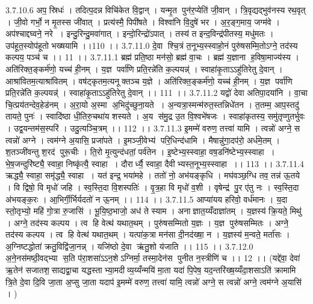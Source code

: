 3.7.10.6
अप॒ स्रिधः॑ । तदित्प॒दन्न विचि॑केत वि॒द्वान् । यन्मृ॒त पुन॑र॒प्येति॑ जी॒वान् । त्रि॒वृद्यद्भुव॑नस्य रथ॒वृत् । जी॒वो गर्भो॒ न मृ॒तस्स जी॑वात् । प्रत्य॑स्मै॒ पिपी॑षते । विश्वा॑नि वि॒दुषे॑ भर । अ॒र॒ङ्ग॒माय॒ जग्म॑वे । अप॑श्चाद्दघ्वने॒ नरे । इन्दु॒रिन्दु॒मवा॑गात् । इन्दो॒रिन्द्रो॑ऽपात् । तस्य॑ त इन्द॒विन्द्र॑पीतस्य॒ मधु॑मतः । उप॑हूत॒स्योप॑हूतो भख्षयामि ।।110 ।।
3.7.11.0
दे॒वा श्चि॒त्रं त॒नूभ्य॒स्स्वाहो॒नं पुरु॑षसम्मि॒तोऽग्ने॒ तद॑स्य कल्पय॒ पञ्च॑ च ।। 11 ।।
3.7.11.1
ब्रह्म॑ प्रति॒ष्ठा मन॑सो॒ ब्रह्म॑ वा॒चः । ब्रह्म॑ य॒ज्ञाना॑ ह॒विषा॒माज्य॑स्य । अति॑रिक्त॒ङ्कर्म॑णो॒ यच्च॑ ही॒नम् । य॒ज्ञ पर्वा॑णि प्रति॒रन्ने॑ति क॒ल्पयन्न्॑ । स्वाहा॑कृ॒ताऽऽहु॑तिरेतु दे॒वान् । आश्रा॑वितम॒त्याश्रा॑वितम् । वष॑ट्कृतम॒त्यनूक्तञ्च य॒ज्ञे । अति॑रिक्त॒ङ्कर्म॑णो॒ यच्च॑ ही॒नम् । य॒ज्ञ पर्वा॑णि प्रति॒रन्ने॑ति क॒ल्पयन्न्॑ । स्वाहा॑कृ॒ताऽऽहु॑तिरेतु दे॒वान् ।। 111 ।।
3.7.11.2
यद्वो॑ देवा अतिपा॒दया॑नि । वा॒चा चि॒त्प्रय॑तन्देव॒हेड॑नम् । अ॒रा॒यो अ॒स्मा अ॒भिदु॑च्छुना॒यते । अ॒न्यत्रा॒स्मन्म॑रुत॒स्तन्निधे॑तन । त॒तम्म॒ आप॒स्तदु॑ तायते॒ पुनः॑ । स्वादि॑ष्ठा धी॒तिरु॒चथा॑य शस्यते । अ॒य स॑मु॒द्र उ॒त वि॒श्वभे॑षजः । स्वाहा॑कृतस्य॒ समु॑तृप्णुतर्भुवः । उद्व॒यन्तम॑स॒स्परि॑ । उदु॒त्यञ्चि॒त्रम् ।। 112 ।।
3.7.11.3
इ॒मम्मे॑ वरुण॒ तत्त्वा॑ यामि । त्वन्नो॑ अग्ने॒ स त्वन्नो॑ अग्ने । त्वम॑ग्ने अ॒यासि॒ प्रजा॑पते । इ॒मञ्जी॒वेभ्य॑ परि॒धिन्द॑धामि । मैषान्नु॑गा॒दप॑रो॒ अर्ध॑मे॒तम् । श॒तञ्जी॑वन्तु श॒रद॑ पुरू॒चीः । ति॒रो मृ॒त्युन्द॑धतां॒ पर्व॑तेन । इ॒ष्टेभ्य॒स्स्वाहा॒ वष॒डनि॑ष्टेभ्य॒स्स्वाहा । भे॒ष॒जन्दुरि॑ष्ट्यै॒ स्वाहा॒ निष्कृ॑त्यै॒ स्वाहा । दौरार्ध्यै॒ स्वाहा॒ दैवीभ्यस्त॒नूभ्य॒स्स्वाहा ।। 113 ।।
3.7.11.4
ऋद्ध्यै॒ स्वाहा॒ समृ॑द्ध्यै॒ स्वाहा । यत॑ इन्द्र॒ भया॑महे । ततो॑ नो॒ अभ॑यङ्कृधि । मघ॑वञ्छ॒ग्धि तव॒ तन्न॑ ऊ॒तये । वि द्विषो॒ वि मृधो॑ जहि । स्व॒स्ति॒दा वि॒शस्पतिः॑ । वृ॒त्र॒हा वि मृधो॑ व॒शी । वृषेन्द्र॑ पु॒र ए॑तु नः । स्व॒स्ति॒दा अ॑भयङ्क॒रः । आ॒भिर्गी॒र्भिर्यदतो॑ न ऊ॒नम् ।। 114 ।।
3.7.11.5
आप्या॑यय हरिवो॒ वर्ध॑मानः । य॒दा स्तो॒तृभ्यो॒ महि॑ गो॒त्रा रु॒जासि॑ । भू॒यि॒ष्ठ॒भाजो॒ अध॑ ते स्याम । अनाज्ञात॒य्यँदाज्ञा॑तम् । य॒ज्ञस्य॑ क्रि॒यते॒ मिथु॑ । अग्ने॒ तद॑स्य कल्पय । त्व हि वेत्थ॑ यथात॒थम् । पुरु॑षसम्मितो य॒ज्ञः । य॒ज्ञ पुरु॑षसम्मितः । अग्ने॒ तद॑स्य कल्पय । त्व हि वेत्थ॑ यथात॒थम् । यत्पा॑क॒त्रा मन॑सा दी॒नद॑ख्षा॒ न । य॒ज्ञस्य॑ म॒न्वते॒ मर्ता॑सः । अ॒ग्निष्टद्धोता॑ क्रतु॒विद्वि॑जा॒नन्न् । यजि॑ष्ठो दे॒वा ऋ॑तु॒शो य॑जाति ।। 115 ।।
3.7.12.0
अ॒ने॒नस॑मष्ठी॒वद्भ्या॑ स॒ति प॑रा॒शसा॑ऽऽन॒शेऽग्निर्मा॒ तस्मा॒देन॑स पुनीत न॒स्त्रीणि॑ च ।। 12 ।। (यद्दे॑वा॒ देवा॑ ऋ॒तेन॑ सजातश॒॒साद्यद्वा॒चा यद्धस्ताभ्या॒मदीव्य॒य्यँन्मयि॑ मा॒ता यदा॑ पि॒पेष॒ यद॒न्तरि॑ख्ष॒य्यँदा॒शसाऽति॑ क्रामामि त्रि॒ते दे॒वा दि॒वि जा॒ता अ॒प्सु जा॒ता यदाप॑ इ॒मम्मे॑ वरुण॒ तत्त्वा॑ यामि॒ त्वन्नो॑ अग्ने॒ स त्वन्नो॑ अग्ने॒ त्वम॑ग्ने अ॒यासि॑ । )

